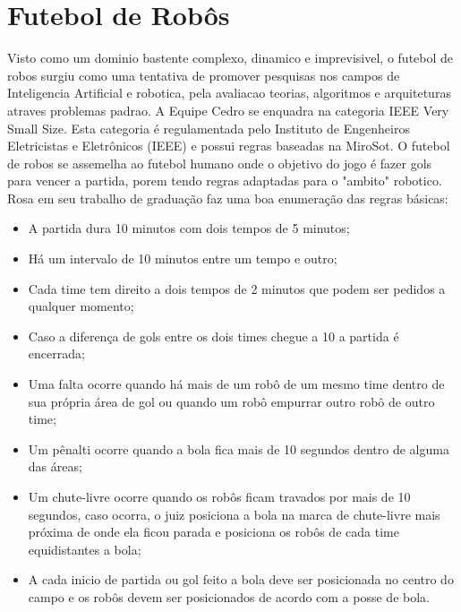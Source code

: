 \section{Futebol de Robôs}
 Visto como um dominio bastente complexo, dinamico e imprevisivel\cite{Costa:2000}, o futebol de robos surgiu como uma tentativa de promover pesquisas nos campos de Inteligencia Artificial e robotica, pela avaliacao teorias, algoritmos e arquiteturas atraves problemas padrao\cite{Kitano:1997}.
 A Equipe Cedro se enquadra na categoria IEEE Very Small Size. Esta categoria é regulamentada pelo Instituto de Engenheiros Eletricistas e Eletrônicos (IEEE) e possui regras baseadas na MiroSot\cite{Rosa:2015}. O futebol de robos se assemelha ao futebol humano onde o objetivo do jogo é fazer gols para vencer a partida, porem tendo regras adaptadas para o "ambito" robotico. 
 Rosa\cite{Rosa:2015} em seu trabalho de graduação faz uma boa enumeração das regras básicas:
 \begin{itemize}
 \item A partida dura 10 minutos com dois tempos de 5 minutos;
  \item Há um intervalo de 10 minutos entre um tempo e outro;
   \item Cada time tem direito a dois tempos de 2 minutos que podem ser pedidos a qualquer
   momento;
    \item Caso a diferença de gols entre os dois times chegue a 10 a partida é encerrada;
     \item Uma falta ocorre quando há mais de um robô de um mesmo time dentro de sua própria
     área de gol ou quando um robô empurrar outro robô de outro time;
     \item Um pênalti ocorre quando a bola fica mais de 10 segundos dentro de alguma das áreas;
     \item Um chute-livre ocorre quando os robôs ficam travados por mais de 10 segundos, caso
     ocorra, o juiz posiciona a bola na marca de chute-livre mais próxima de onde ela ficou
     parada e posiciona os robôs de cada time equidistantes a bola;
     \item A cada inicio de partida ou gol feito a bola deve ser posicionada no centro do campo e os
     robôs devem ser posicionados de acordo com a posse de bola.
 \end{itemize}
